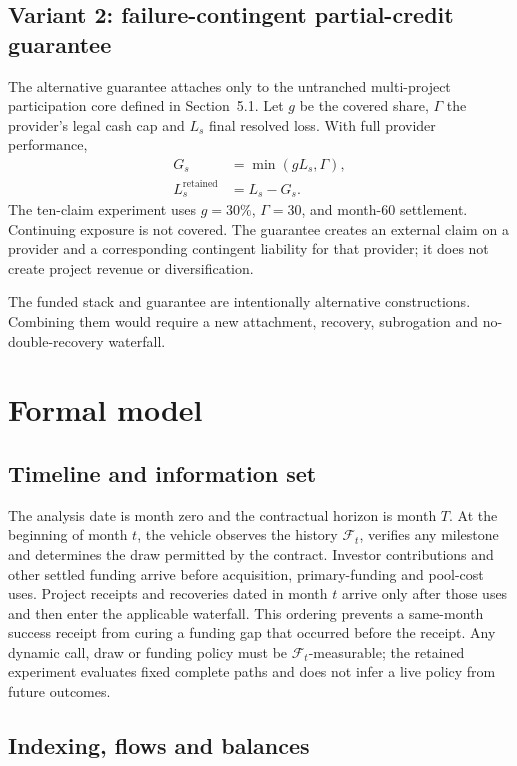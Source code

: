 \documentclass[11pt,a4paper]{article}
\begin{document}
\subsection{Variant 2: failure-contingent partial-credit guarantee}

The alternative guarantee attaches only to the untranched multi-project participation core defined in Section~5.1. Let \(g\) be the covered share, \(\Gamma\) the provider's legal cash cap and \(L_s\) final resolved loss. With full provider performance,
\begin{align}
G_s &= \min(gL_s,\Gamma),\\
L^{\mathrm{retained}}_s &= L_s-G_s.
\end{align}
The ten-claim experiment uses \(g=30\%\), \(\Gamma=30\), and month-60 settlement. Continuing exposure is not covered. The guarantee creates an external claim on a provider and a corresponding contingent liability for that provider; it does not create project revenue or diversification.

The funded stack and guarantee are intentionally alternative constructions. Combining them would require a new attachment, recovery, subrogation and no-double-recovery waterfall.

\section{Formal model}

\subsection{Timeline and information set}

The analysis date is month zero and the contractual horizon is month \(T\). At the beginning of month \(t\), the vehicle observes the history \(\mathcal F_t\), verifies any milestone and determines the draw permitted by the contract. Investor contributions and other settled funding arrive before acquisition, primary-funding and pool-cost uses. Project receipts and recoveries dated in month \(t\) arrive only after those uses and then enter the applicable waterfall. This ordering prevents a same-month success receipt from curing a funding gap that occurred before the receipt. Any dynamic call, draw or funding policy must be \(\mathcal F_t\)-measurable; the retained experiment evaluates fixed complete paths and does not infer a live policy from future outcomes.

\subsection{Indexing, flows and balances}
\end{document}
